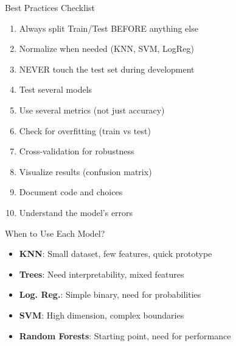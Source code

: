 \documentclass[aspectratio=169]{beamer}
\begin{document}
\begin{frame}{Best Practices Checklist}
\begin{enumerate}
    \item Always split Train/Test BEFORE anything else
    \item Normalize when needed (KNN, SVM, LogReg)
    \item NEVER touch the test set during development
    \item Test several models
    \item Use several metrics (not just accuracy)
    \item Check for overfitting (train vs test)
    \item Cross-validation for robustness
    \item Visualize results (confusion matrix)
    \item Document code and choices
    \item Understand the model's errors
\end{enumerate}
\end{frame}



\begin{frame}{When to Use Each Model?}
\begin{itemize}
    \item \textbf{KNN}: Small dataset, few features, quick prototype
    \item \textbf{Trees}: Need interpretability, mixed features
    \item \textbf{Log. Reg.}: Simple binary, need for probabilities
    \item \textbf{SVM}: High dimension, complex boundaries
    \item \textbf{Random Forests}: Starting point, need for performance
\end{itemize}


\end{frame}
\end{document}

